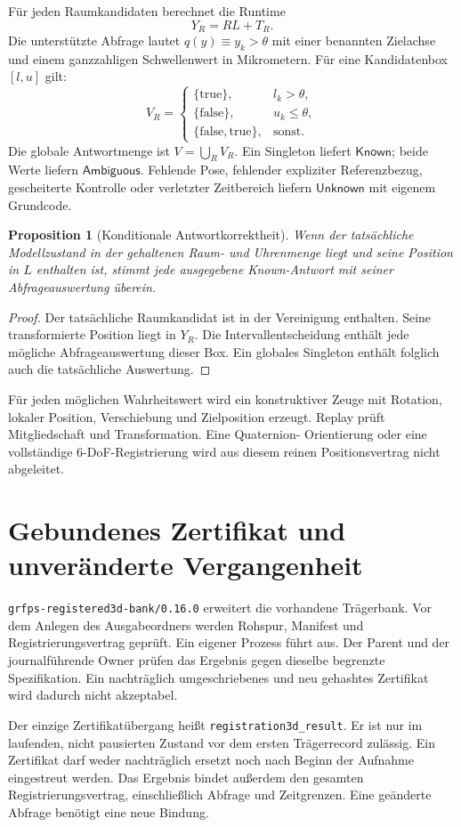 \documentclass[11pt,a4paper]{article}
\newcommand{\Known}{\ensuremath{\mathsf{Known}}}
\newcommand{\Unknown}{\ensuremath{\mathsf{Unknown}}}
\newcommand{\Ambiguous}{\ensuremath{\mathsf{Ambiguous}}}
\newcommand{\nextsection}[2]{\clearpage{\color{accent}\small\textsf{#1}}\section{#2}}
\newtheorem{proposition}{Proposition}[section]
\begin{document}
Für jeden Raumkandidaten berechnet die Runtime
\[
 Y_R=RL+T_R.
\]
Die unterstützte Abfrage lautet $q(y)\equiv y_k>\theta$ mit einer
benannten Zielachse und einem ganzzahligen Schwellenwert in Mikrometern.
Für eine Kandidatenbox $[l,u]$ gilt:
\[
 V_R=\begin{cases}
 \{\mathrm{true}\},&l_k>\theta,\\
 \{\mathrm{false}\},&u_k\leq\theta,\\
 \{\mathrm{false},\mathrm{true}\},&\text{sonst}.
 \end{cases}
\]
Die globale Antwortmenge ist $V=\bigcup_R V_R$. Ein Singleton
liefert \Known; beide Werte liefern \Ambiguous. Fehlende Pose,
fehlender expliziter Referenzbezug, gescheiterte Kontrolle oder
verletzter Zeitbereich liefern \Unknown{} mit eigenem Grundcode.

\begin{proposition}[Konditionale Antwortkorrektheit]
Wenn der tatsächliche Modellzustand in der gehaltenen Raum- und
Uhrenmenge liegt und seine Position in $L$ enthalten ist, stimmt
jede ausgegebene Known-Antwort mit seiner Abfrageauswertung überein.
\end{proposition}
\begin{proof}
Der tatsächliche Raumkandidat ist in der Vereinigung enthalten.
Seine transformierte Position liegt in $Y_R$. Die Intervallentscheidung
enthält jede mögliche Abfrageauswertung dieser Box. Ein globales
Singleton enthält folglich auch die tatsächliche Auswertung.
\end{proof}

Für jeden möglichen Wahrheitswert wird ein konstruktiver Zeuge
mit Rotation, lokaler Position, Verschiebung und Zielposition erzeugt.
Replay prüft Mitgliedschaft und Transformation. Eine Quaternion-
Orientierung oder eine vollständige 6-DoF-Registrierung wird aus
diesem reinen Positionsvertrag nicht abgeleitet.

\nextsection{95 / LAUFZEITANSCHLUSS}{Gebundenes Zertifikat und unveränderte Vergangenheit}
\texttt{grfps-registered3d-bank/0.16.0} erweitert die vorhandene
Trägerbank. Vor dem Anlegen des Ausgabeordners werden Rohspur,
Manifest und Registrierungsvertrag geprüft. Ein eigener Prozess
führt  aus. Der Parent und der
journalführende Owner prüfen das Ergebnis gegen dieselbe begrenzte
Spezifikation. Ein nachträglich umgeschriebenes und neu gehashtes
Zertifikat wird dadurch nicht akzeptabel.

Der einzige Zertifikatübergang heißt
\texttt{registration3d\_result}. Er ist nur im laufenden,
nicht pausierten Zustand vor dem ersten Trägerrecord zulässig.
Ein Zertifikat darf weder nachträglich ersetzt noch nach Beginn
der Aufnahme eingestreut werden. Das Ergebnis bindet außerdem
den gesamten Registrierungsvertrag, einschließlich Abfrage und
Zeitgrenzen. Eine geänderte Abfrage benötigt eine neue Bindung.
\end{document}
